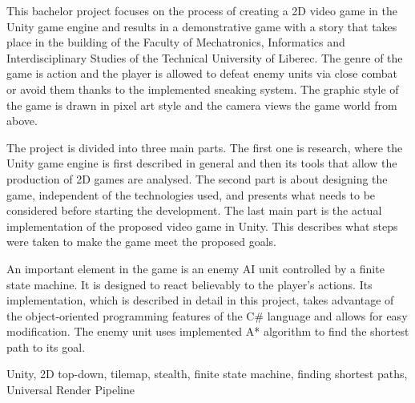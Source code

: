 \documentclass[FM,Proj]{tulthesis}
\begin{document}
	\begin{abstractEN}
		This bachelor project focuses on the process of creating a 2D video game in the Unity game engine and results in a demonstrative game with a story that takes place in the building of the Faculty of Mechatronics, Informatics and Interdisciplinary Studies of the Technical University of Liberec. The genre of the game is action and the player is allowed to defeat enemy units via close combat or avoid them thanks to the implemented sneaking system. The graphic style of the game is drawn in pixel art style and the camera views the game world from above.
		
		The project is divided into three main parts. The first one is research, where the Unity game engine is first described in general and then its tools that allow the production of 2D games are analysed. The second part is about designing the game, independent of the technologies used, and presents what needs to be considered before starting the development. The last main part is the actual implementation of the proposed video game in Unity. This describes what steps were taken to make the game meet the proposed goals.
		
		An important element in the game is an enemy AI unit controlled by a finite state machine. It is designed to react believably to the player's actions. Its implementation, which is described in detail in this project, takes advantage of the object-oriented programming features of the C\# language and allows for easy modification. The enemy unit uses implemented A* algorithm to find the shortest path to its goal.
	\end{abstractEN}
	
	\begin{keywordsEN}
		Unity, 2D top-down, tilemap, stealth, finite state machine, finding shortest paths, Universal Render Pipeline
	\end{keywordsEN}
	
	
	\tableofcontents
	
	\listoffigures
	
	
	\clearpage
	
\end{document}
